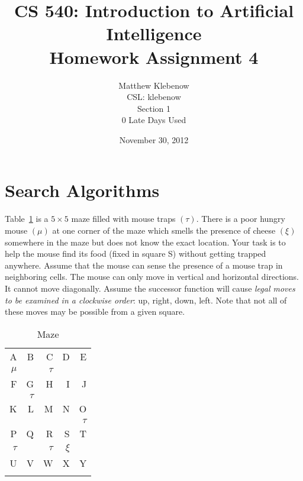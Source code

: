 \documentclass[12pt,letterpaper,titlepage]{article}
\title{CS 540: Introduction to Artificial Intelligence\\Homework Assignment 4}
\author{Matthew Klebenow\\CSL: klebenow\\Section 1\\0 Late Days Used}
\date{November 30, 2012}
\begin{document}
\maketitle
\tableofcontents
\listoftables
\listoffigures
\pagebreak
\section[Question 1]{Search Algorithms}
Table~\ref{tab:q1} is a $5\times5$ maze filled with mouse traps $\left(\tau\right)$. There is a poor hungry mouse $\left(\mu\right)$ at one corner of the maze which smells the presence of cheese $\left(\xi\right)$ somewhere in the maze but does not know the exact location. Your task is to help the mouse find its food (fixed in square S) without getting trapped anywhere. Assume that the mouse can sense the presence of a mouse trap in neighboring cells. The mouse can only move in vertical and horizontal directions. It cannot move diagonally. Assume the successor function will cause \textit{legal moves to be examined in a clockwise order}: up, right, down, left. Note that not all of these moves may be possible from a given square.
\label{q1}
\begin{table}[htbp]
  \centering
  \caption{Maze}
    \begin{tabular}{rrrrr}
    \toprule
    A     & B     & C     & D     & E \\
    $\mu$     &       & $\tau$     &       &  \\ \midrule
    F     & G     & H     & I     & J \\
          & $\tau$     &       &       &  \\ \midrule
    K     & L     & M     & N     & O \\
          &       &       &       & $\tau$ \\ \midrule
    P     & Q     & R     & S     & T \\
    $\tau$     &       & $\tau$     & $\xi$     &  \\ \midrule
    U     & V     & W     & X     & Y \\
          &       &       &       &  \\
    \bottomrule
    \end{tabular}%
  \label{tab:q1}%
\end{table}%
\end{document}
